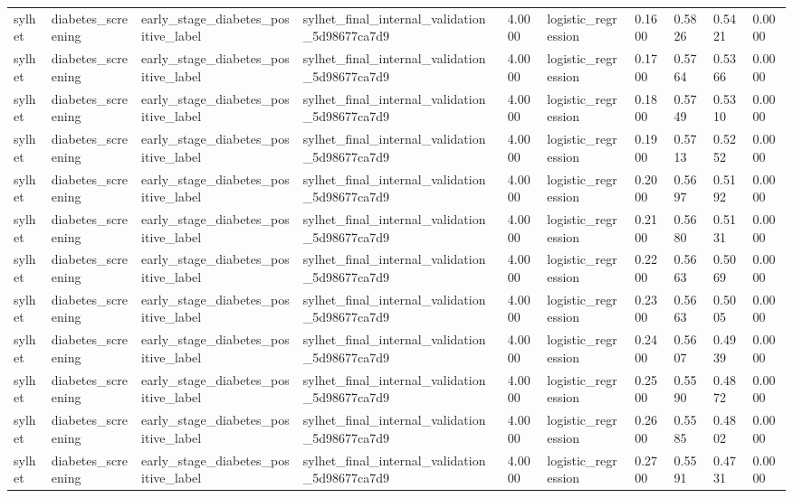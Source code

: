 \begin{tabular}{llllllllll}
sylhet & diabetes\_screening & early\_stage\_diabetes\_positive\_label & sylhet\_final\_internal\_validation\_5d98677ca7d9 & 4.0000 & logistic\_regression & 0.1600 & 0.5826 & 0.5421 & 0.0000 \\
sylhet & diabetes\_screening & early\_stage\_diabetes\_positive\_label & sylhet\_final\_internal\_validation\_5d98677ca7d9 & 4.0000 & logistic\_regression & 0.1700 & 0.5764 & 0.5366 & 0.0000 \\
sylhet & diabetes\_screening & early\_stage\_diabetes\_positive\_label & sylhet\_final\_internal\_validation\_5d98677ca7d9 & 4.0000 & logistic\_regression & 0.1800 & 0.5749 & 0.5310 & 0.0000 \\
sylhet & diabetes\_screening & early\_stage\_diabetes\_positive\_label & sylhet\_final\_internal\_validation\_5d98677ca7d9 & 4.0000 & logistic\_regression & 0.1900 & 0.5713 & 0.5252 & 0.0000 \\
sylhet & diabetes\_screening & early\_stage\_diabetes\_positive\_label & sylhet\_final\_internal\_validation\_5d98677ca7d9 & 4.0000 & logistic\_regression & 0.2000 & 0.5697 & 0.5192 & 0.0000 \\
sylhet & diabetes\_screening & early\_stage\_diabetes\_positive\_label & sylhet\_final\_internal\_validation\_5d98677ca7d9 & 4.0000 & logistic\_regression & 0.2100 & 0.5680 & 0.5131 & 0.0000 \\
sylhet & diabetes\_screening & early\_stage\_diabetes\_positive\_label & sylhet\_final\_internal\_validation\_5d98677ca7d9 & 4.0000 & logistic\_regression & 0.2200 & 0.5663 & 0.5069 & 0.0000 \\
sylhet & diabetes\_screening & early\_stage\_diabetes\_positive\_label & sylhet\_final\_internal\_validation\_5d98677ca7d9 & 4.0000 & logistic\_regression & 0.2300 & 0.5663 & 0.5005 & 0.0000 \\
sylhet & diabetes\_screening & early\_stage\_diabetes\_positive\_label & sylhet\_final\_internal\_validation\_5d98677ca7d9 & 4.0000 & logistic\_regression & 0.2400 & 0.5607 & 0.4939 & 0.0000 \\
sylhet & diabetes\_screening & early\_stage\_diabetes\_positive\_label & sylhet\_final\_internal\_validation\_5d98677ca7d9 & 4.0000 & logistic\_regression & 0.2500 & 0.5590 & 0.4872 & 0.0000 \\
sylhet & diabetes\_screening & early\_stage\_diabetes\_positive\_label & sylhet\_final\_internal\_validation\_5d98677ca7d9 & 4.0000 & logistic\_regression & 0.2600 & 0.5585 & 0.4802 & 0.0000 \\
sylhet & diabetes\_screening & early\_stage\_diabetes\_positive\_label & sylhet\_final\_internal\_validation\_5d98677ca7d9 & 4.0000 & logistic\_regression & 0.2700 & 0.5591 & 0.4731 & 0.0000 \\

\end{tabular}
